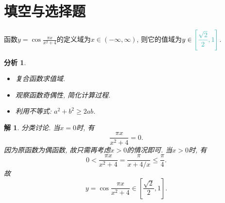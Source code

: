 \documentclass[a4paper, 12pt]{ctexart}
\theoremstyle{plain}
\theoremstyle{nonumberplain}
\newtheorem{solution}{解}
\theoremstyle{nonumberplain}
\newtheorem{analysis}{分析}
\theoremstyle{nonumberplain}
\newcommand{\ans}[1]{\textcolor{Aquamarine}{#1}}
\begin{document}
    \section{填空与选择题}

    \begin{problem}
        函数$\displaystyle y=\cos\frac{\pi x}{x^2+4}$的定义域为$x\in(-\infty, \infty)$, 则它的值域为$y\in\ans{\displaystyle\left[\frac{\sqrt{2}}{2}, 1\right]}$.
    \end{problem}
    \begin{analysis}\hspace{\fill}
        \begin{itemize}
            \item 复合函数求值域.
            \item 观察函数奇偶性, 简化计算过程.
            \item 利用不等式: $a^2+b^2\geq 2ab$.
        \end{itemize}
    \end{analysis}
    \begin{solution}
        分类讨论. 当$x=0$时, 有
        \begin{equation}
            \frac{\pi x}{x^2+4}=0.
        \end{equation}
        因为原函数为偶函数, 故只需再考虑$x>0$的情况即可. 当$x>0$时, 有
        \begin{equation}
            0<\frac{\pi x}{x^2+4}=\frac{\pi}{x+4/x}\leq\frac{\pi}{4}.
        \end{equation}
        故
        \begin{equation}
            y=\cos \frac{\pi x}{x^2+4}\in\left[\frac{\sqrt{2}}{2}, 1\right].
        \end{equation}%
    \end{solution}
\end{document}
